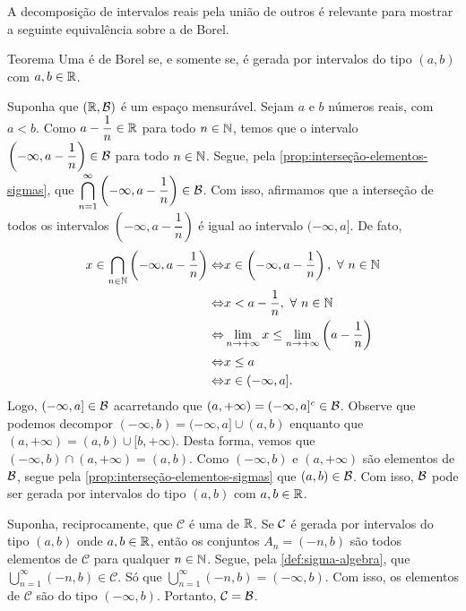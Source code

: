 A decomposição de intervalos reais pela união de outros é relevante para mostrar a seguinte equivalência sobre a \sigal de Borel.\\
\begin{env}{Teorema}
\label{teo:equiv-borel}
    Uma \sigal é de Borel  se, e somente se, é gerada por intervalos do tipo $(a,b)$ com $a,b \in \mathbb{R}$.
    \vspace{-0.2cm}
\end{env}
\begin{prova}
   Suponha que $(\mathbb{R},\operatorname{\mathcal{B}})$ é um espaço mensurável. 
   Sejam $a$ e $b$ números reais, com $a<b$.
   Como $a - \dfrac{1}{n} \in \mathbb{R}$ para todo $n \in \operatorname{\mathbb{N}}$, temos que o intervalo
   $\left(-\infty, a- \dfrac{1}{n}\right) \in \operatorname{\mathcal{B}}$ para todo $n \in \operatorname{\mathbb{N}}$.
   Segue, pela \ref{prop:interseção-elementos-sigmas}, que
   $\displaystyle \bigcap_{n = 1}^\infty \left(-\infty, a- \dfrac{1}{n}\right) \in \operatorname{\mathcal{B}}$.
   Com isso, afirmamos que a interseção de todos os intervalos $\left(-\infty, a - \dfrac{1}{n}\right)$ é igual ao intervalo $(-\infty, a]$.
   De fato,
   \begin{align*}
   		x \in \bigcap_{n \in \operatorname{\mathbb{N}}} \left(-\infty, a - \dfrac{1}{n}\right)
   		\Leftrightarrow & x \in \left(-\infty, a - \dfrac{1}{n}\right), \ \forall \ n \in \operatorname{\mathbb{N}}\\
   		\Leftrightarrow & x < a - \dfrac{1}{n}, \ \forall \ n \in \operatorname{\mathbb{N}}\\
   		\Leftrightarrow & \displaystyle \lim_{n \to +\infty} x \leq \displaystyle \lim_{n \to +\infty} \left(a - \dfrac{1}{n}\right)\\
   		\Leftrightarrow & x \leq a\\
   		\Leftrightarrow & x \in (-\infty, a].
   \end{align*}
	Logo, $(-\infty, a] \in \operatorname{\mathcal{B}}$ acarretando que $(a, +\infty) = (-\infty, a]^c \in \operatorname{\mathcal{B}}$.
	Observe que podemos decompor $(-\infty, b) = (-\infty,a] \cup (a, b)$ enquanto que $(a, +\infty) = (a, b) \cup [b, +\infty)$.
	Desta forma, vemos que $(-\infty, b) \cap (a, +\infty) = (a,b)$. 
	Como $(-\infty, b)$ e $(a, +\infty)$ são elementos de $\operatorname{\mathcal{B}}$, segue pela 
	\ref{prop:interseção-elementos-sigmas} que $(a,b) \in \operatorname{\mathcal{B}}$.
	Com isso, $\operatorname{\mathcal{B}}$ pode ser gerada por intervalos do tipo $(a,b)$ com $a,b \in \mathbb{R}$.
   
	Suponha, reciprocamente, que $\mathcal{C}$ é uma \sigal de $\mathbb{R}$.
	Se $\operatorname{\mathcal{C}}$ é gerada por intervalos do tipo $(a,b)$ onde $a,b \in \mathbb{R}$, então
	os conjuntos $A_n = (-n, b)$ são todos elementos de $\mathcal{C}$ para qualquer $n \in \operatorname{\mathbb{N}}$.
	Segue, pela  \ref{def:sigma-algebra}, que 
	$\displaystyle \bigcup_{n = 1}^\infty (-n,b) \in \mathcal{C}$.
	Só que $\displaystyle \bigcup_{n = 1}^\infty (-n,b) = (-\infty, b)$.
	Com isso, os elementos de $\mathcal{C}$ são do tipo $(-\infty, b)$.
	Portanto, $\mathcal{C} = \operatorname{\mathcal{B}}$.
\end{prova}

